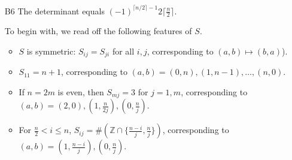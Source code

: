 \documentclass[amssymb,twocolumn,pra,10pt,aps]{revtex4-1}
\newcommand{\ZZ}{\mathbb{Z}}
\begin{document}
\begin{itemize}
\begin{proof}
We next check the ``if'' direction. We may partition the cycles of $\sigma$ into individual cycles of odd length and pairs of cycles of the same even length; then we may argue as above to write each partition as the square of another permutation.
\end{proof}

Suppose now that $n>1$ is odd. Write $n = p^e k$ where $p$ is an odd prime, $k$ is a positive integer, and $\gcd(p,k) = 1$. 
By the Chinese remainder theorem, we have a ring isomorphism 
\[
\ZZ/n\ZZ \cong \ZZ/p^e \ZZ \times \ZZ/k \ZZ.
\]
Recall that the group $(\ZZ/p^e \ZZ)^\times$ is cyclic; choose $m \in \ZZ$ reducing to a generator of $(\ZZ/p^e \ZZ)^\times$ and to the identity in $(\ZZ/k\ZZ)^\times$. Then $\sigma_{n,m}$ consists of $k$ cycles (an odd number) of length $p^{e-1}(p-1)$ (an even number) plus some shorter cycles. By Lemma~\ref{lem:2023B5-2}, $\sigma_{n,m}$ does not have a square root.

Suppose next that $n \equiv 2 \pmod{4}$. Write $n = 2k$ with $k$ odd, so that 
\[
\ZZ/n\ZZ \cong \ZZ/2\ZZ \times \ZZ/k\ZZ.
\]
Then $\sigma_{n,m}$ acts on $\{0\} \times \ZZ/k\ZZ$ and $\{1\} \times \ZZ/k\ZZ$ with the same cycle structure, so every cycle length occurs an even number of times. By Lemma~\ref{lem:2023B5-2}, $\sigma_{n,m}$ has a square root.

Finally, suppose that $n$ is divisible by 4. For $m = -1$, $\sigma_{n,m}$ consists of two fixed points ($0$ and $n/2$) together with $n/2-1$ cycles (an odd number) of length 2 (an even number). 
By Lemma~\ref{lem:2023B5-2}, $\sigma_{n,m}$ does not have a square root.

\item[B6]
The determinant equals $(-1)^{\lceil n/2 \rceil-1} 2 \lceil \frac{n}{2} \rceil$.

To begin with, we read off the following features of $S$.
\begin{itemize}
\item
$S$ is symmetric: $S_{ij} = S_{ji}$ for all $i,j$, corresponding to $(a,b) \mapsto (b,a)$).
\item
$S_{11} = n+1$, corresponding to $(a,b) = (0,n),(1,n-1),\dots,(n,0)$.
\item
If $n = 2m$ is even, then $S_{mj} = 3$ for $j=1,m$, corresponding to $(a,b) = (2,0),(1,\frac{n}{2j}),(0,\frac{n}{j})$.
\item
For $\frac{n}{2} < i \leq n$, $S_{ij} = \# (\ZZ \cap \{\frac{n-i}{j}, \frac{n}{j}\})$, corresponding to $(a,b) = (1, \frac{n-i}{j}), (0, \frac{n}{j})$.
\end{itemize}


\end{itemize}
\end{document}
